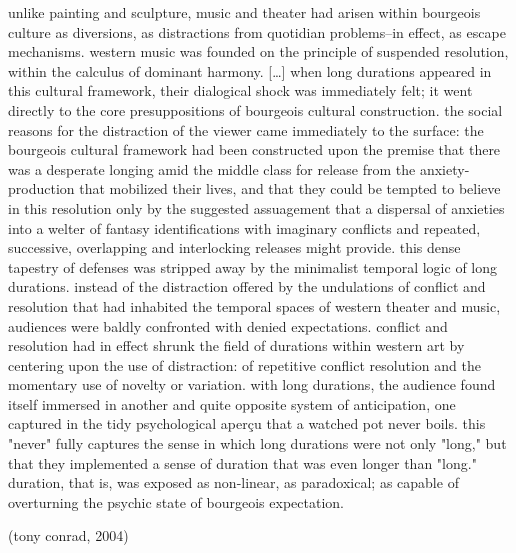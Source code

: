 \documentclass[12pt,a4paper,british,landscape]{article}
\begin{document}
\begin{center}

unlike painting and sculpture, music and theater had arisen within bourgeois culture as diversions, as distractions from quotidian problems--in effect, as escape mechanisms. western music was founded on the principle of suspended resolution, within the calculus of dominant harmony. [\dots]
when long durations appeared in this cultural framework, their dialogical shock was immediately felt; it went directly to the core presuppositions of bourgeois cultural construction. the social reasons for the distraction of the viewer came immediately to the surface: the bourgeois cultural framework had been constructed upon the premise that there was a desperate longing amid the middle class for release from the anxiety-production that mobilized their lives, and that they could be tempted to believe in this resolution only by the suggested assuagement that a dispersal of anxieties into a welter of fantasy identifications with imaginary conflicts and repeated, successive, overlapping and interlocking releases might provide.
this dense tapestry of defenses was stripped away by the minimalist temporal logic of long durations.
instead of the distraction offered by the undulations of conflict and resolution that had inhabited the temporal spaces of western theater and music, audiences were baldly confronted with denied expectations.
conflict and resolution had in effect shrunk the field of durations within western art by centering upon the use of distraction: of repetitive conflict resolution and the momentary use of novelty or variation.
with long durations, the audience found itself immersed in another and quite opposite system of anticipation, one captured in the tidy psychological aperçu that a watched pot never boils. this "never" fully captures the sense in which long durations were not only "long," but that they implemented a sense of duration that was even longer than "long."
duration, that is, was exposed as non-linear, as paradoxical; as capable of overturning the psychic state of bourgeois expectation.

\vspace{0.5cm}

(tony conrad, 2004)

\end{center}
\end{document}
